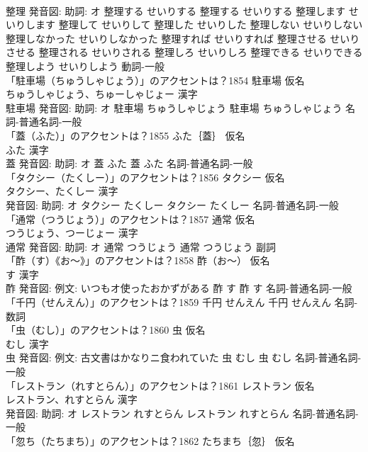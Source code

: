 \documentclass[8pt]{extreport}
\begin{document}
\begin{CJK}{UTF8}{min}
\\	整理 発音図: 助詞: オ	整理する せいりする		整理する せいりする 整理します せいりします 整理して せいりして 整理した せいりした 整理しない せいりしない 整理しなかった せいりしなかった 整理すれば せいりすれば 整理させる せいりさせる 整理される せいりされる 整理しろ せいりしろ 整理できる せいりできる 整理しよう せいりしよう				動詞-一般 
\\	「駐車場（ちゅうしゃじょう）」のアクセントは？1854	駐車場 仮名　
\\	ちゅうしゃじょう、ちゅーしゃじょー 漢字　
\\	駐車場 発音図: 助詞: オ	駐車場 ちゅうしゃじょう		駐車場 ちゅうしゃじょう				名詞-普通名詞-一般 
\\	「蓋（ふた）」のアクセントは？1855	ふた｛蓋｝ 仮名　
\\	ふた 漢字　
\\	蓋 発音図: 助詞: オ	蓋 ふた		蓋 ふた				名詞-普通名詞-一般 
\\	「タクシー（たくしー）」のアクセントは？1856	タクシー 仮名　
\\	タクシー、たくしー 漢字　
\\	発音図: 助詞: オ	タクシー たくしー		タクシー たくしー				名詞-普通名詞-一般 
\\	「通常（つうじょう）」のアクセントは？1857	通常 仮名　
\\	つうじょう、つーじょー 漢字　
\\	通常 発音図: 助詞: オ	通常 つうじょう		通常 つうじょう				副詞 
\\	「酢（す）《お〜》」のアクセントは？1858	酢（お〜） 仮名　
\\	す 漢字　
\\	酢 発音図: 例文: いつもオ使ったおかずがある	酢 す		酢 す				名詞-普通名詞-一般 
\\	「千円（せんえん）」のアクセントは？1859		千円 せんえん		千円 せんえん				名詞-数詞 
\\	「虫（むし）」のアクセントは？1860	虫 仮名　
\\	むし 漢字　
\\	虫 発音図: 例文: 古文書はかなりニ食われていた	虫 むし		虫 むし				名詞-普通名詞-一般 
\\	「レストラン（れすとらん）」のアクセントは？1861	レストラン 仮名　
\\	レストラン、れすとらん 漢字　
\\	発音図: 助詞: オ	レストラン れすとらん		レストラン れすとらん				名詞-普通名詞-一般 
\\	「忽ち（たちまち）」のアクセントは？1862	たちまち｛忽｝ 仮名　

\end{CJK}
\end{document}
